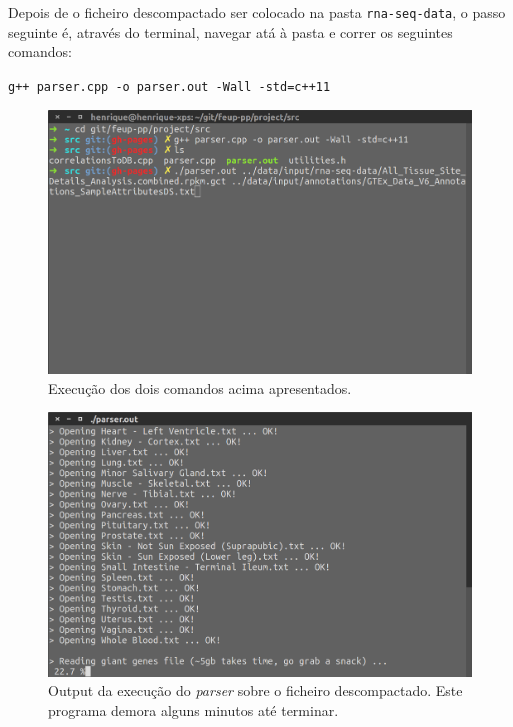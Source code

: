 \medskip

Depois de o ficheiro descompactado ser colocado na pasta \texttt{rna-seq-data}, o passo seguinte é, através do terminal, navegar atá à pasta  e correr os seguintes comandos:

\smallskip

\texttt{g++ parser.cpp -o parser.out -Wall -std=c++11}

\smallskip

\texttt{}

\medskip

\begin{figure}[ht]
    \centering
    \includegraphics[width=0.7\linewidth]{res/parser-1.png}
    \caption{Execução dos dois comandos acima apresentados.}
    \label{fig:parser-1}
\end{figure}

\medskip

\begin{figure}[ht]
    \centering
    \includegraphics[width=0.7\linewidth]{res/parser-2.png}
    \caption{Output da execução do \textit{parser} sobre o ficheiro descompactado. Este programa demora alguns minutos até terminar.}
    \label{fig:parser-2}
\end{figure}

